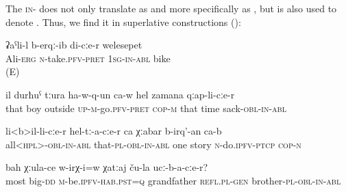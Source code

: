 The \textsc{in}- does not only translate as   and more specifically as  , but is also used to denote  . Thus, we find it in superlative constructions  ():
%
\begin{exe}
	\ex	\label{Ali took away my bike.}
	\gll ʡaˁli-l		b-erqː-ib			di-cːe-r welesepet\\
	Ali-\textsc{erg} \textsc{n}-take.\textsc{pfv-pret} \textsc{1sg-in-abl} bike\\
	\glt	{} (E)
	
	\ex	\label{At this time that boy came out of the sack}
	\gll	il	durħuˁ	tːura	ha-w-q-un ca-w	hel	zamana	qːap-li-cːe-r\\
		that	boy	outside	\textsc{up-m}-go.\textsc{pfv}-\textsc{pret} \textsc{cop-m}	that	time	sack-\textsc{obl-in}-\textsc{abl}\\
	\glt	{}

	\ex	\label{from all, from them (you) need to make one story}
	\gll	li<b>il-li-cːe-r	hel-tː-a-cːe-r	ca	χːabar	b-irq'-an ca-b \\
		all<\textsc{hpl}>-\textsc{obl-in}-\textsc{abl} that-\textsc{pl}-\textsc{obl-in}-\textsc{abl}	one	story	\textsc{n}-do.\textsc{ipfv}-\textsc{ptcp} \textsc{cop-n}\\
	\glt	{}
	
	\ex	\label{Was grandfather the oldest among his brothers}
	\gll	bah	χːula-ce	w-irχ-i=w	χatːaj	ču-la	ucː-b-a-cːe-r? \\
		most	big-\textsc{dd}	\textsc{m}-be.\textsc{ipfv}-\textsc{hab}.\textsc{pst}=\textsc{q} grandfather	\textsc{refl}.\textsc{pl}-\textsc{gen}	brother-\textsc{pl}-\textsc{obl-in}-\textsc{abl}\\
	\glt	{}
\end{exe}

